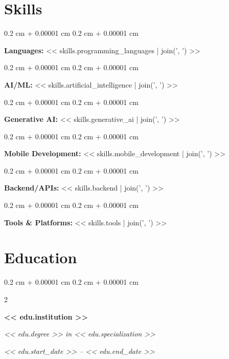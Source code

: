 \documentclass[10pt, letterpaper]{article}
\newenvironment{onecolentry}{
    \begin{adjustwidth}{
        0.2 cm + 0.00001 cm
    }{
        0.2 cm + 0.00001 cm
    }
}{
    \end{adjustwidth}
}
\newenvironment{twocolentry}[2][]{
    \onecolentry
    \def\secondColumn{#2}
    \setcolumnwidth{\fill, 4.5 cm}
    \begin{paracol}{2}
}{
    \switchcolumn \raggedleft \secondColumn
    \end{paracol}
    \endonecolentry
}
\begin{document}
    \section{Skills}
        \begin{onecolentry}
            \textbf{Languages:} << skills.programming_languages | join(', ') >>
        \end{onecolentry}
        \vspace{0.2 cm}
        \begin{onecolentry}
            \textbf{AI/ML:} << skills.artificial_intelligence | join(', ') >>
        \end{onecolentry}
        \vspace{0.2 cm}
        \begin{onecolentry}
            \textbf{Generative AI:} << skills.generative_ai | join(', ') >>
        \end{onecolentry}
        \vspace{0.2 cm}
        \begin{onecolentry}
            \textbf{Mobile Development:} << skills.mobile_development | join(', ') >>
        \end{onecolentry}
        \vspace{0.2 cm}
        \begin{onecolentry}
            \textbf{Backend/APIs:} << skills.backend | join(', ') >>
        \end{onecolentry}
        \vspace{0.2 cm}
        \begin{onecolentry}
            \textbf{Tools \& Platforms:} << skills.tools | join(', ') >>
        \end{onecolentry}


    \section{Education}
        \begin{twocolentry}{
            \textit{<< edu.start_date >> -- << edu.end_date >>}}
            \textbf{<< edu.institution >>}

            \textit{<< edu.degree >> in << edu.specialization >>}
        \end{twocolentry}
\end{document}

